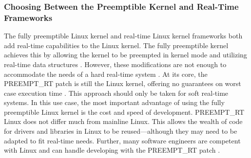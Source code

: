             \subsubsection{Choosing Between the Preemptible Kernel and Real-Time Frameworks}
            \markboth{}{}
                The fully preemptible Linux kernel and real-time Linux kernel
                    frameworks both add real-time capabilities to the Linux
                    kernel.
                The fully preemptible kernel achieves this by allowing the
                    kernel to be preempted in kernel mode and utilizing
                    real-time data structures \cite{linux-preemption-models}.
                However, these modifications are not enough to accommodate the
                    needs of a hard real-time system \cite{preempt-rt-survey}.
                At its core, the PREEMPT\_RT patch is still the Linux kernel,
                    offering no guarantees on worst case execution time
                    \cite{preempt-rt-survey}.
                This approach should only be taken for soft real-time systems.
                In this use case, the most important advantage of using the
                    fully preemptible Linux kernel is the cost and speed of
                    development.
                PREEMPT\_RT Linux does not differ much from mainline Linux.
                This allows the wealth of code for drivers and libraries in
                    Linux to be reused---although they may need to be adapted to
                    fit real-time needs.
                Further, many software engineers are competent with Linux and
                    can handle developing with the PREEMPT\_RT patch
                    \cite{preempt-rt-survey}.

